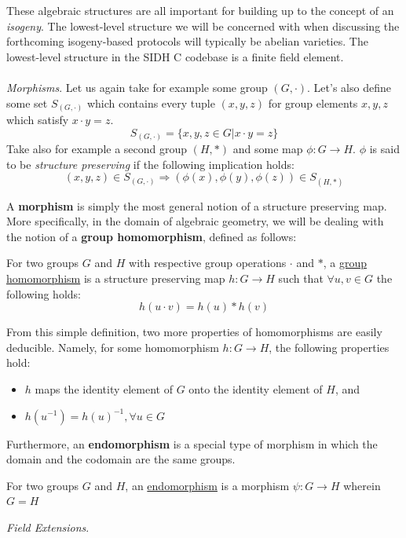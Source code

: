 These algebraic structures are all important for building up to the concept of an \emph{isogeny}. The lowest-level structure we will be concerned with when discussing the forthcoming isogeny-based protocols will typically be abelian varieties. The lowest-level structure in the SIDH C codebase is a finite field element.\\\\

\noindent
\emph{Morphisms}. Let us again take for example some group $(G,\cdot)$. Let's also define some set $S_{(G,\cdot)}$ which contains every tuple $(x,y,z)$ for group elements $x,y,z$ which satisfy $x\cdot y = z$.
$$
S_{(G,\cdot)} = \{x,y,z \in G | x\cdot y = z\}
$$
Take also for example a second group $(H,*)$ and some map $\phi: G \rightarrow H$. $\phi$ is said to be \emph{structure preserving} if the following implication holds:
$$
(x,y,z) \in S_{(G,\cdot)} \Rightarrow (\phi(x),\phi(y),\phi(z)) \in S_{(H,*)}
$$

A \textbf{morphism} is simply the most general notion of a structure preserving map. More specifically, in the domain of algebraic geometry, we will be dealing with the notion of a \textbf{group homomorphism}, defined as follows:
\begin{definition}
\label{defn:homomorphism}
For two groups $G$ and $H$ with respective group operations $\cdot$ and $*$, a \underline{group homomorphism} is a structure preserving map $h: G \rightarrow H$ such that $\forall u, v \in G$ the following holds:
$$h(u \cdot v) = h(u) * h(v)$$
\end{definition}
From this simple definition, two more properties of homomorphisms are easily deducible. Namely, for some homomorphism $h: G \rightarrow H$, the following properties hold:
\begin{itemize}
\item $h$ maps the identity element of $G$ onto the identity element of $H$, and
\item $h(u^{-1}) = h(u)^{-1}, \forall u \in G$
\end{itemize}
Furthermore, an \textbf{endomorphism} is a special type of morphism in which the domain and the codomain are the same groups.
\begin{definition}[Endomorphism]
\label{defn:endomorphism}
For two groups $G$ and $H$, an \underline{endomorphism} is a morphism $\psi: G \rightarrow H$ wherein $G = H$
\end{definition}

\noindent
\emph{Field Extensions}.

